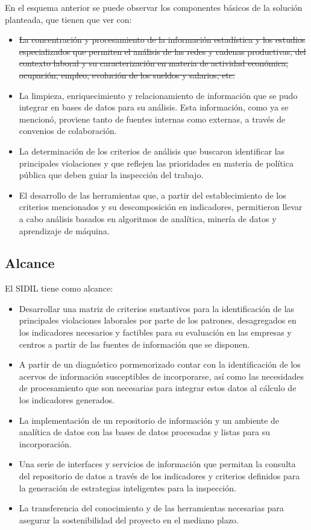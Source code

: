 \documentclass[
]{article}
\providecommand{\tightlist}{%
  \setlength{\itemsep}{0pt}\setlength{\parskip}{0pt}}
\begin{document}
En el esquema anterior se puede observar los componentes básicos de la solución planteada, que tienen que ver con:

\begin{itemize}
\tightlist
\item
  \st{La concentración y procesamiento de la información estadística y los estudios especializados que permiten el análisis de las redes y cadenas productivas, del contexto laboral y su caracterización en materia de actividad económica, ocupación, empleo, evolución de los sueldos y salarios, etc.}
\item
  La limpieza, enriquecimiento y relacionamiento de información que se pudo integrar en bases de datos para su análisis. Esta información, como ya se mencionó, proviene tanto de fuentes internas como externas, a través de convenios de colaboración.
\item
  La determinación de los criterios de análisis que buscaron identificar las principales violaciones y que reflejen las prioridades en materia de política pública que deben guiar la inspección del trabajo.
\item
  El desarrollo de las herramientas que, a partir del establecimiento de los criterios mencionados y su descomposición en indicadores, permitieron llevar a cabo análisis basados en algoritmos de analítica, minería de datos y aprendizaje de máquina.
\end{itemize}

\hypertarget{introalcance}{%
\subsection{Alcance}\label{introalcance}}

El SIDIL tiene como alcance:

\begin{itemize}
\tightlist
\item
  Desarrollar una matriz de criterios sustantivos para la identificación de las principales violaciones laborales por parte de los patrones, desagregados en los indicadores necesarios y factibles para su evaluación en las empresas y centros a partir de las fuentes de información que se disponen.
\item
  A partir de un diagnóstico pormenorizado contar con la identificación de los acervos de información susceptibles de incorporarse, así como las necesidades de procesamiento que son necesarias para integrar estos datos al cálculo de los indicadores generados.
\item
  La implementación de un repositorio de información y un ambiente de analítica de datos con las bases de datos procesadas y listas para su incorporación.
\item
  Una serie de interfaces y servicios de información que permitan la consulta del repositorio de datos a través de los indicadores y criterios definidos para la generación de estrategias inteligentes para la inspección.
\item
  La transferencia del conocimiento y de las herramientas necesarias para asegurar la sostenibilidad del proyecto en el mediano plazo.
\end{itemize}
\end{document}
